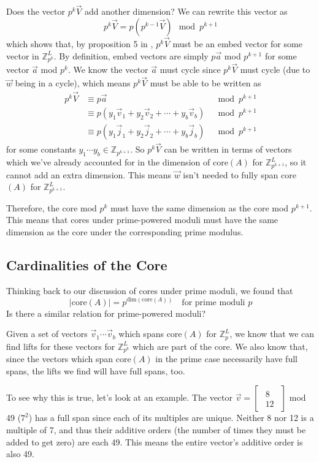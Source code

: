 \documentclass[a4paper, 12pt, reqno]{amsart}
\newcommand{\ssubsection}[1]{\vspace{0.25cm}\subsection{#1}}
\begin{document}
	Does the vector $p^{k}\vec{V}$ add another dimension? We can rewrite this vector as
	\[
		p^{k}\vec{V} = p(p^{k-1}\vec{V}) \mod{p^{k+1}}
	\]
	which shows that, by proposition 5 in \citet{Mendivil2012}, $p^{k}\vec{V}$ must be an embed vector for
	some vector in $\mathds{Z}_{p^k}^L$. By definition, embed vectors are simply $p\vec{a}$ mod $p^{k+1}$ 
	for some vector $\vec{a}$ mod $p^k$. We know the vector $\vec{a}$ must cycle since $p^{k}\vec{V}$ must
	cycle (due to $\vec{w}$ being in a cycle), which means $p^{k}\vec{V}$ must be able to be written as
	\begin{align*}
		p^{k}\vec{V} & \equiv p\vec{a}                                                     & \mod{p^{k+1}} \\
								 & \equiv p(y_{1}\vec{v}_1 + y_{2}\vec{v}_2 + \cdots + y_{b}\vec{v}_b) & \mod{p^{k+1}} \\
								 & \equiv p(y_{1}\vec{j}_1 + y_{2}\vec{j}_2 + \cdots + y_{b}\vec{j}_b) & \mod{p^{k+1}}
	\end{align*}
	for some constants $y_1 \cdots y_b \in \mathds{Z}_{p^{k+1}}$. So $p^{k}\vec{V}$ can be written
	in terms of vectors which we've already accounted for in the dimension of core$(A)$ for 
	$\mathds{Z}_{p^{k+1}}^L$, so it cannot add an extra dimension. This means $\vec{w}$ isn't needed
	to fully span core$(A)$ for $\mathds{Z}_{p^{k+1}}^L$.
	
	Therefore, the core mod $p^{k}$ must have the same dimension as the core mod $p^{k+1}$.
	This means that cores under prime-powered moduli must have the same dimension as the core
	under the corresponding prime modulus.
	
	\ssubsection{Cardinalities of the Core}
	Thinking back to our discussion of cores under prime moduli, we found that
	\[
		|\text{core}(A)| = p^{\text{dim}(\text{core}(A))} \quad \text{for prime moduli} \,\, p 
	\]
	Is there a similar relation for prime-powered moduli? 
	
	Given a set of vectors $\vec{v}_1 \cdots \vec{v}_b$ which spans core$(A)$ for $\mathds{Z}_p^L$,
	we know that we can find lifts for these vectors for $\mathds{Z}_{p^k}^L$ which are part of
	the core. We also know that, since the vectors which span core$(A)$ in the prime case
	necessarily have full spans, the lifts we find will have full spans, too.
	
	To see why this is true, let's look at an example. The vector $\vec{v} = 
		\begin{bmatrix}
			\begin{smallmatrix}
				8 \\
				12
			\end{smallmatrix}
		\end{bmatrix}
	$
	mod 49 ($7^{2}$) has a full span since each of its multiples are unique. Neither 8 nor 12 is 
	a multiple of 7, and thus their additive orders (the number of times they must be added to get 
	zero) are each 49. This means the entire vector's additive order is also 49.
	
\end{document}
